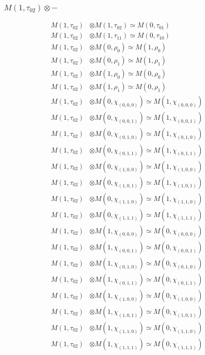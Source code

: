 \subsubsection{$ M(1,\tau_{02})\otimes -$}
\begin{align*}
M(1,\tau_{02}) &\otimes M(1,\tau_{02}) \simeq M(0,\tau_{01}) \\
M(1,\tau_{02}) &\otimes M(1,\tau_{11}) \simeq M(0,\tau_{10}) \\
M(1,\tau_{02}) &\otimes M(0,\rho_{0}) \simeq M(1,\rho_{0}) \\
M(1,\tau_{02}) &\otimes M(0,\rho_{1}) \simeq M(1,\rho_{1}) \\
M(1,\tau_{02}) &\otimes M(1,\rho_{0}) \simeq M(0,\rho_{0}) \\
M(1,\tau_{02}) &\otimes M(1,\rho_{1}) \simeq M(0,\rho_{1}) \\
M(1,\tau_{02}) &\otimes M(0,\chi_{(0,0,0)}) \simeq M(1,\chi_{(0,0,0)}) \\
M(1,\tau_{02}) &\otimes M(0,\chi_{(0,0,1)}) \simeq M(1,\chi_{(0,0,1)}) \\
M(1,\tau_{02}) &\otimes M(0,\chi_{(0,1,0)}) \simeq M(1,\chi_{(0,1,0)}) \\
M(1,\tau_{02}) &\otimes M(0,\chi_{(0,1,1)}) \simeq M(1,\chi_{(0,1,1)}) \\
M(1,\tau_{02}) &\otimes M(0,\chi_{(1,0,0)}) \simeq M(1,\chi_{(1,0,0)}) \\
M(1,\tau_{02}) &\otimes M(0,\chi_{(1,0,1)}) \simeq M(1,\chi_{(1,0,1)}) \\
M(1,\tau_{02}) &\otimes M(0,\chi_{(1,1,0)}) \simeq M(1,\chi_{(1,1,0)}) \\
M(1,\tau_{02}) &\otimes M(0,\chi_{(1,1,1)}) \simeq M(1,\chi_{(1,1,1)}) \\
M(1,\tau_{02}) &\otimes M(1,\chi_{(0,0,0)}) \simeq M(0,\chi_{(0,0,0)}) \\
M(1,\tau_{02}) &\otimes M(1,\chi_{(0,0,1)}) \simeq M(0,\chi_{(0,0,1)}) \\
M(1,\tau_{02}) &\otimes M(1,\chi_{(0,1,0)}) \simeq M(0,\chi_{(0,1,0)}) \\
M(1,\tau_{02}) &\otimes M(1,\chi_{(0,1,1)}) \simeq M(0,\chi_{(0,1,1)}) \\
M(1,\tau_{02}) &\otimes M(1,\chi_{(1,0,0)}) \simeq M(0,\chi_{(1,0,0)}) \\
M(1,\tau_{02}) &\otimes M(1,\chi_{(1,0,1)}) \simeq M(0,\chi_{(1,0,1)}) \\
M(1,\tau_{02}) &\otimes M(1,\chi_{(1,1,0)}) \simeq M(0,\chi_{(1,1,0)}) \\
M(1,\tau_{02}) &\otimes M(1,\chi_{(1,1,1)}) \simeq M(0,\chi_{(1,1,1)}) \\

\end{align*}
